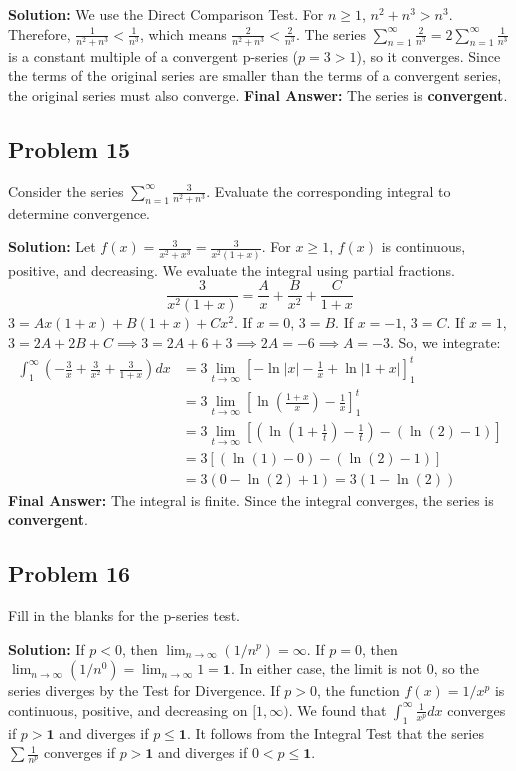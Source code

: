 \documentclass{article}
\begin{document}
\textbf{Solution:}
We use the Direct Comparison Test. For $n \ge 1$, $n^2+n^3 > n^3$.
Therefore, $\frac{1}{n^2+n^3} < \frac{1}{n^3}$, which means $\frac{2}{n^2+n^3} < \frac{2}{n^3}$.
The series $\sum_{n=1}^{\infty} \frac{2}{n^3} = 2 \sum_{n=1}^{\infty} \frac{1}{n^3}$ is a constant multiple of a convergent p-series ($p=3>1$), so it converges.
Since the terms of the original series are smaller than the terms of a convergent series, the original series must also converge.
\textbf{Final Answer:} The series is \textbf{convergent}.

\subsection*{Problem 15}
Consider the series $\sum_{n=1}^{\infty} \frac{3}{n^2+n^3}$. Evaluate the corresponding integral to determine convergence.

\textbf{Solution:}
Let $f(x) = \frac{3}{x^2+x^3} = \frac{3}{x^2(1+x)}$. For $x \ge 1$, $f(x)$ is continuous, positive, and decreasing. We evaluate the integral using partial fractions.
\[ \frac{3}{x^2(1+x)} = \frac{A}{x} + \frac{B}{x^2} + \frac{C}{1+x} \]
$3 = Ax(1+x) + B(1+x) + Cx^2$.
If $x=0$, $3=B$. If $x=-1$, $3=C$. If $x=1$, $3=2A+2B+C \implies 3=2A+6+3 \implies 2A=-6 \implies A=-3$.
So, we integrate:
\begin{align*}
    \int_1^\infty \left( -\frac{3}{x} + \frac{3}{x^2} + \frac{3}{1+x} \right) dx &= 3 \lim_{t \to \infty} \left[ -\ln|x| - \frac{1}{x} + \ln|1+x| \right]_1^t \\
    &= 3 \lim_{t \to \infty} \left[ \ln\left(\frac{1+x}{x}\right) - \frac{1}{x} \right]_1^t \\
    &= 3 \lim_{t \to \infty} \left[ \left(\ln\left(1+\frac{1}{t}\right) - \frac{1}{t}\right) - \left(\ln(2) - 1\right) \right] \\
    &= 3 [ (\ln(1) - 0) - (\ln(2) - 1) ] \\
    &= 3 (0 - \ln(2) + 1) = 3(1-\ln(2))
\end{align*}
\textbf{Final Answer:} The integral is finite. Since the integral converges, the series is \textbf{convergent}.

\subsection*{Problem 16}
Fill in the blanks for the p-series test.

\textbf{Solution:}
If $p < 0$, then $\lim_{n \to \infty} (1/n^p) = \infty$. If $p=0$, then $\lim_{n \to \infty} (1/n^0) = \lim_{n \to \infty} 1 = \textbf{1}$. In either case, the limit is not 0, so the series diverges by the Test for Divergence.
If $p>0$, the function $f(x) = 1/x^p$ is continuous, positive, and decreasing on $[1, \infty)$.
We found that $\int_1^\infty \frac{1}{x^p} dx$ converges if $p > \textbf{1}$ and diverges if $p \le \textbf{1}$.
It follows from the Integral Test that the series $\sum \frac{1}{n^p}$ converges if $p > \textbf{1}$ and diverges if $0 < p \le \textbf{1}$.
\end{document}

